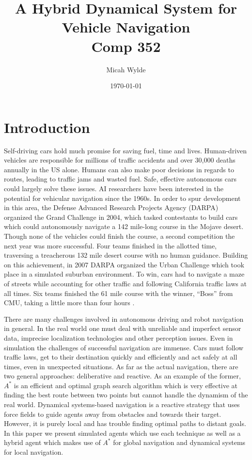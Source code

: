 \documentclass{article}
\author{Micah Wylde}
\date{\today}
\title{A Hybrid Dynamical System for Vehicle Navigation\\
Comp 352}
\begin{document}
\maketitle

\section{Introduction}
Self-driving cars hold much promise for saving fuel, time and
lives. Human-driven vehicles are responsible for millions of traffic accidents
and over 30,000 deaths annually in the US alone. Humans can also make poor
decisions in regards to routes, leading to traffic jams and wasted fuel. Safe,
effective autonomous cars could largely solve these issues. AI researchers have
been interested in the potential for vehicular navigation since the 1960s. In
order to spur development in this area, the Defense Advanced Research Projects
Agency (DARPA) organized the Grand Challenge in 2004, which tasked contestants
to build cars which could autonomously navigate a 142 mile-long course in the
Mojave desert. Though none of the vehicles could finish the course, a second
competition the next year was more successful. Four teams finished in the
allotted time, traversing a treacherous 132 mile desert course with no human
guidance. Building on this achievement, in 2007 DARPA organized the Urban
Challenge which took place in a simulated suburban environment. To win, cars had
to navigate a maze of streets while accounting for other traffic and following
California traffic laws at all times. Six teams finished the 61 mile course with
the winner, ``Boss'' from CMU, taking a little more than four hours
\cite{robotic_cars}.

There are many challenges involved in autonomous driving and robot navigation in
general. In the real world one must deal with unreliable and imperfect sensor
data, imprecise localization technologies and other perception issues. Even in
simulation the challenges of successful navigation are immense. Cars must follow
traffic laws, get to their destination quickly and efficiently and act safely at
all times, even in unexpected situations. As far as the actual navigation, there
are two general approaches: deliberative and reactive. As an example of the
former, $A^*$ is an efficient and optimal graph search algorithm which is very
effective at finding the best route between two points but cannot handle the
dynamism of the real world. Dynamical systems-based navigation is a reactive
strategy that uses force fields to guide agents away from obstacles and towards
their target. However, it is purely local and has trouble finding optimal paths
to distant goals. In this paper we present simulated agents which use each
technique as well as a hybrid agent which makes use of $A^*$ for global
navigation and dynamical systems for local navigation.
\end{document}
